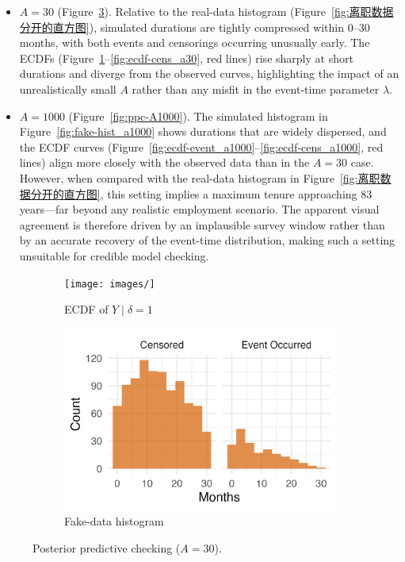 \begin{itemize}
    \item $A = 30$ (Figure~\ref{fig:ppc-A30}). Relative to the real-data histogram (Figure~\ref{fig:离职数据分开的直方图}), simulated durations are tightly compressed within 0–30 months, with both events and censorings occurring unusually early. The ECDFs (Figure~\ref{fig:ecdf-event_a30}–\ref{fig:ecdf-cens_a30}, red lines) rise sharply at short durations and diverge from the observed curves, highlighting the impact of an unrealistically small $A$ rather than any misfit in the event-time parameter $\lambda$.
    \item $A = 1000$ (Figure~\ref{fig:ppc-A1000}). The simulated histogram in Figure~\ref{fig:fake-hist_a1000} shows durations that are widely dispersed, and the ECDF curves (Figure~\ref{fig:ecdf-event_a1000}–\ref{fig:ecdf-cens_a1000}, red lines) align more closely with the observed data than in the $A=30$ case. However, when compared with the real-data histogram in Figure~\ref{fig:离职数据分开的直方图}, this setting implies a maximum tenure approaching 83 years—far beyond any realistic employment scenario. The apparent visual agreement is therefore driven by an implausible survey window rather than by an accurate recovery of the event-time distribution, making such a setting unsuitable for credible model checking.
\end{itemize}
\begin{figure}[H]
\centering
\begin{subfigure}[t]{0.32\textwidth}
  \centering
  \texttt{[image: images/]}  %
  \caption{{\small ECDF of $Y \mid \delta=1$}}
  \label{fig:ecdf-event_a30}
\end{subfigure}
\begin{subfigure}[t]{0.35\textwidth}
  \centering
  \includegraphics[width=\linewidth]{images/fake_duration_hist_a30.png}   %
  \caption{{\small Fake-data histogram}}
  \label{fig:fake-hist_a30}
\end{subfigure}
\caption{{\small Posterior predictive checking ($A=30$).}}
\label{fig:ppc-A30}
\end{figure}

